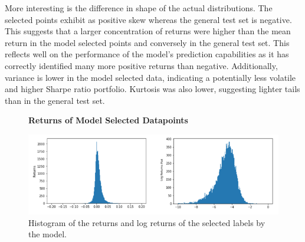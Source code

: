 \documentclass[10pt,onecolumn,letterpaper]{article}
\newcommand*{\figuretitle}[1]{%
    {\centering%
    \textbf{#1}%
    \par\medskip}%
}
\begin{document}
More interesting is the difference in shape of the actual distributions. The selected points exhibit as positive skew whereas the general test set is negative. This suggests that a larger concentration of returns were higher than the mean return in the model selected points and conversely in the general test set. This reflects well on the performance of the model's prediction capabilities as it has correctly identified many more positive returns than negative. Additionally, variance is lower in the model selected data, indicating a potentially less volatile and higher Sharpe ratio portfolio. Kurtosis was also lower, suggesting lighter tails than in the general test set. 


\begin{figure}[!hbt!]
\figuretitle{Returns of Model Selected Datapoints} 
\centering
\includegraphics[width=16.5cm]{results_distributions.png}
\caption{Histogram of the returns and log returns of the selected labels by the model.}
\end{figure}
\end{document}
